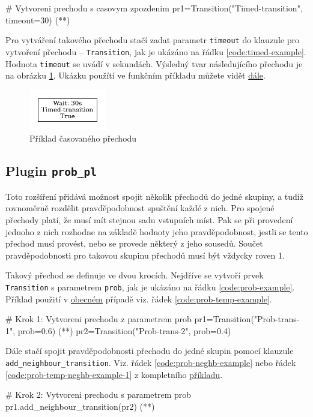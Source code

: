 \begin{python}
 # Vytvoreni prechodu s casovym zpozdenim
 pr1=Transition("Timed-transition", timeout=30) (*\label{code:timed-example}*)
\end{python}

Pro vytváření takového přechodu stačí zadat parametr \texttt{timeout} do klauzule pro vytvoření přechodu -- \texttt{Transition}, jak je ukázáno na řádku \ref{code:timed-example}. Hodnota \texttt{timeout} se uvádí v sekundách. Výsledný tvar následujícího přechodu je na obrázku \ref{timed-transition}. Ukázku použítí ve funkčním příkladu můžete vidět \hyperref[code:timed-temp-example]{dále}.

\begin{figure}[hbt]
 \centering
 \includegraphics[width=0.3\textwidth]{obrazky-figures/timed-transition.png}
 \caption{Příklad časovaného přechodu}
 \label{timed-transition}
\end{figure}

\subsection{Plugin \texttt{prob\_pl}}
\label{subsec:prob_pl}
Toto rozšíření přidává možnost spojit několik přechodů do jedné skupiny, a tudíž rovnoměrně rozdělit pravděpodobnost spuštění každé z nich. Pro spojené přechody platí, že musí mít stejnou sadu vstupních míst. Pak se při provedení jednoho z nich rozhodne na základě hodnoty jeho pravděpodobnost, jestli se tento přechod musí provést, nebo se provede některý z jeho sousedů. Součet pravděpodobnosti pro takovou skupinu přechodů musí být vždycky roven 1.

Takový přechod se definuje ve dvou krocích. Nejdříve se vytvoří prvek \texttt{Transition} s parametrem \texttt{prob}, jak je ukázáno na řádku \ref{code:prob-example}. Příklad použití v \hyperref[code:prob-ev-draw]{obecném} případě viz. řádek \ref{code:prob-temp-example}.
\begin{python}
 # Krok 1: Vytvoreni prechodu z parametrem prob
 pr1=Transition("Prob-trans-1", prob=0.6) (*\label{code:prob-example}*)
 pr2=Transition("Prob-trans-2", prob=0.4)
\end{python}

Dále stačí spojit pravděpodobnosti přechodu do jedné skupin pomocí klauzule \\ \texttt{add\_neighbour\_transition}. Viz. řádek \ref{code:prob-neghb-example} nebo řádek \ref{code:prob-temp-neghb-example-1} z kompletního \hyperref[code:prob-ev-draw]{příkladu}.
\begin{python}
 # Krok 2: Vytvoreni prechodu s parametrem prob
 pr1.add_neighbour_transition(pr2) (*\label{code:prob-neghb-example}*)
\end{python}

